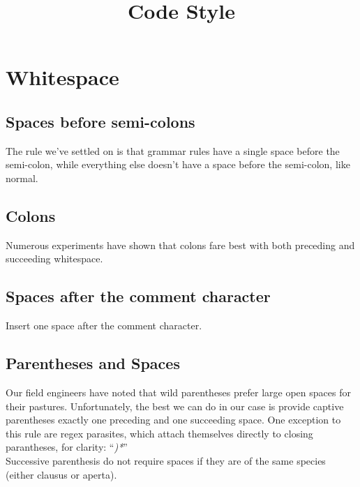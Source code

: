 \documentclass[12pt, notitlepage]{article}
\begin{document}
\title{Code Style}\author{}\date{}\maketitle

\section{Whitespace}

\subsection{Spaces before semi-colons}
The rule we've settled on is that grammar rules have a single space before the semi-colon, while everything else doesn't have a space before the semi-colon, like normal.

\subsection{Colons}
Numerous experiments have shown that colons fare best with both preceding and succeeding whitespace.

\subsection{Spaces after the comment character}
Insert one space after the comment character.

\subsection{Parentheses and Spaces}
Our field engineers have noted that wild parentheses prefer large open spaces for their pastures.
Unfortunately, the best we can do in our case is provide captive parentheses exactly one preceding and one succeeding space.
One exception to this rule are regex parasites, which attach themselves directly to closing parantheses, for clarity: ``\textit{)*}''\\
Successive parenthesis do not require spaces if they are of the same species (either clausus or aperta).
\end{document}
